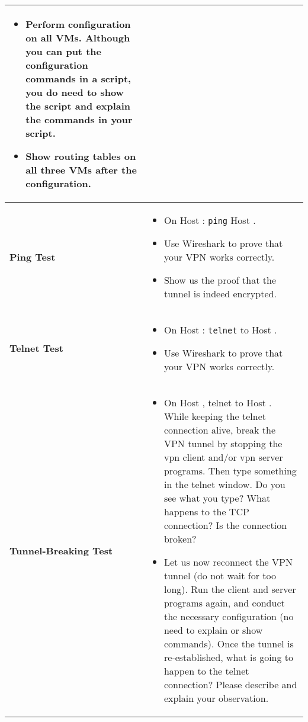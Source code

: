 \begin{longtable}{|p{}|p{}|}
\begin{itemize}[topsep=-0.5cm,leftmargin=0.4cm]
	   \item Perform configuration on all VMs. Although you can put the configuration
	   commands in a script, you do need to show the script and explain the commands in
	   your script.

	   \item Show routing tables on all three VMs after the configuration.
	\end{itemize}
 \\ 
 \hline

 \textbf{Ping Test} & 
 	\vspace*{-0.3cm}
 	\begin{itemize}[topsep=-0.5cm,leftmargin=0.4cm]
		\item On Host \hostu: \texttt{ping} Host \hostv.
		\item Use Wireshark to prove that your VPN works correctly.
		\item Show us the proof that the tunnel is indeed encrypted.
	\end{itemize}
 \\ 
 \hline

 \textbf{Telnet Test} & 
 	\vspace*{-0.3cm}
 	\begin{itemize}[topsep=-0.5cm,leftmargin=0.4cm]
		\item On Host \hostu: \texttt{telnet} to Host \hostv.
		\item Use Wireshark to prove that your VPN works correctly.
	\end{itemize}
 \\ 
 \hline

 \textbf{Tunnel-Breaking Test} & 
 	\vspace*{-0.3cm}
 	\begin{itemize}[topsep=-0.5cm,leftmargin=0.4cm]
		\item On Host \hostu, telnet to Host \hostv. While keeping the telnet connection alive,
		break the VPN tunnel by stopping the vpn client and/or vpn server programs.
		Then type something in the telnet window. Do you see what you type? What
		happens to the TCP connection? Is the connection broken? 

		\item Let us now reconnect the VPN tunnel (do not wait for too long). 
		Run the client and server programs again, and conduct the necessary
		configuration (no need to explain or show commands). Once the tunnel is
		re-established, what is going to happen to the telnet connection? Please
		describe and explain your observation.


\end{itemize}
\end{longtable}

